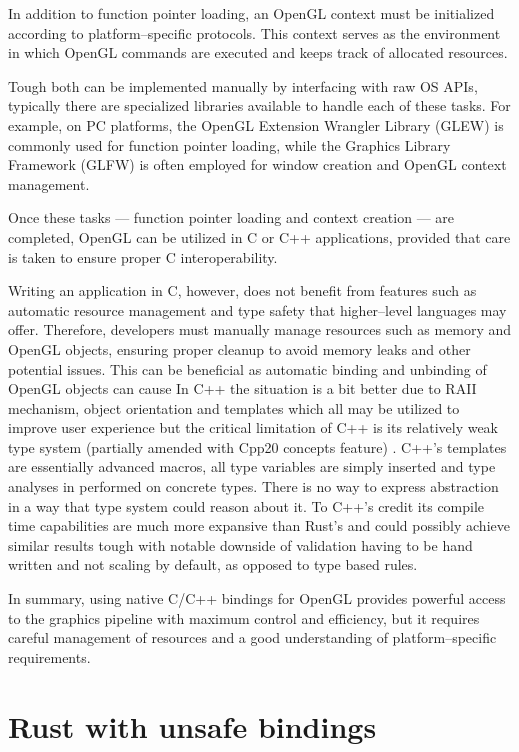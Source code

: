 In addition to function pointer loading, an OpenGL context must be initialized according to platform--specific protocols. 
This context serves as the environment in which OpenGL commands are executed and keeps track of allocated resources.

Tough both can be implemented manually by interfacing with raw OS APIs, typically there are specialized libraries available to handle each of these tasks.
For example, on PC platforms, the OpenGL Extension Wrangler Library (GLEW) \cite{glewwebsite} is commonly used for function pointer loading, 
while the Graphics Library Framework (GLFW) \cite{glfwwebsite} is often employed for window creation and OpenGL context management.

Once these tasks --- function pointer loading and context creation --- are completed, OpenGL can be utilized in C or C++ applications, provided that care is taken to ensure proper C interoperability. 

Writing an application in C, however, does not benefit from features such as automatic resource management and type safety that higher--level languages may offer.
Therefore, developers must manually manage resources such as memory and OpenGL objects, ensuring proper cleanup to avoid memory leaks and other potential issues.
This can be beneficial as automatic binding and unbinding of OpenGL objects can cause 
In C++ the situation is a bit better due to RAII mechanism, object orientation and templates which all may be utilized to improve user experience but the
critical limitation of C++ is its relatively weak type system (partially amended with Cpp20 concepts feature) \cite{cppref}.
C++'s templates are essentially advanced macros, all type variables are simply inserted and type analyses in performed on concrete types.
There is no way to express abstraction in a way that type system could reason about it.
To C++'s credit its compile time capabilities are much more expansive than Rust's and could possibly achieve similar results tough
with notable downside of validation having to be hand written and not scaling by default, as opposed to type based rules.

In summary, using native C/C++ bindings for OpenGL provides powerful access to the graphics pipeline with maximum control and efficiency, 
but it requires careful management of resources and a good understanding of platform--specific requirements.

\section{Rust with unsafe bindings}

